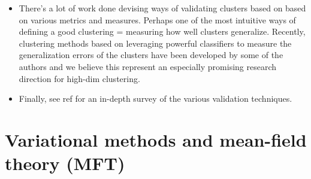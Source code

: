 \documentclass[norsk,a4paper,11pt]{article}
\begin{document}
\begin{itemize}
	\item There's a lot of work done devising ways of validating clusters based on based on various metrics and measures. Perhaps one of the most intuitive ways of defining a good clustering = measuring how well clusters generalize. Recently, clustering methods based on leveraging powerful classifiers to measure the generalization errors of the clusters have been developed by some of the authors and we believe this represent an especially promising research direction for high-dim clustering.
	\item Finally, see ref for an in-depth survey of the various validation techniques.
\end{itemize}




\section{Variational methods and mean-field theory (MFT)}
\end{document}
